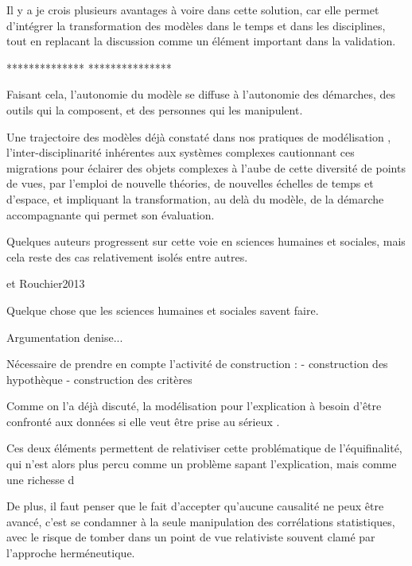 Il y a je crois plusieurs avantages à voire dans cette solution, car elle permet d'intégrer la transformation des modèles dans le temps et dans les disciplines, tout en replacant la discussion comme un élément important dans la validation. 

**************
***************

Faisant cela, l'autonomie du modèle se diffuse à l'autonomie des démarches, des outils qui la composent, et des personnes qui les manipulent.

Une trajectoire des modèles déjà constaté dans nos pratiques de modélisation \autocite{Banos2013}, l'inter-disciplinarité inhérentes aux systèmes complexes cautionnant ces migrations pour éclairer des objets complexes à l'aube de cette diversité de points de vues, par l'emploi de nouvelle théories, de nouvelles échelles de temps et d'espace, et impliquant la transformation, au delà du modèle, de la démarche accompagnante qui permet son évaluation.

Quelques auteurs progressent sur cette voie en sciences humaines et sociales, mais cela reste des cas relativement isolés \autocite{Ngo2012} \autocite{Schmitt2014} \autocite{Heppenstall2007} \autocite{Stonedahl2011a} entre autres.





et Rouchier2013


Quelque chose que les sciences humaines et sociales savent faire.

Argumentation denise...


Nécessaire de prendre en compte l'activité de construction :
- construction des hypothèque 
- construction des critères



Comme on l'a déjà discuté, la modélisation pour l'explication à besoin d'être confronté aux données si elle veut être prise au sérieux \autocite{Banos2013}.






Ces deux éléments permettent de relativiser cette problématique de l'équifinalité, qui n'est alors plus percu comme un problème sapant l'explication, mais comme une richesse d






De plus, il faut penser que le fait d'accepter qu'aucune causalité ne peux être avancé, c'est se condamner à la seule manipulation des corrélations statistiques, avec le risque de tomber dans un point de vue relativiste souvent clamé par l'approche herméneutique.






